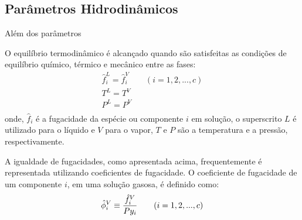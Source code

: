 \begin{enumerate}
\subsection{Parâmetros Hidrodinâmicos}
\label{sec:parametroshidrodinamicos}

Além dos parâmetros 

O equilíbrio termodinâmico é alcançado quando são satisfeitas as condições de equilíbrio químico, térmico e
mecânico entre as fases:
\begin{equation}
\begin{array}{c}
\hat{f}^L_i = \hat{f}^V_i \qquad (i = 1,2,...,c) \\
T^L = T^V \\
P^L = P^V \\
\end{array}
\end{equation}
onde, $\hat{f}_i$ é a fugacidade da espécie ou componente $i$ em solução, o superscrito
$L$ é utilizado para o líquido e $V$ para o vapor, $T$ e $P$ são a temperatura
e a pressão, respectivamente.


A igualdade de fugacidades, como apresentada acima, frequentemente é
representada utilizando coeficientes de fugacidade.
O coeficiente de fugacidade de um componente $i$, em uma solução gasosa, é
definido como:
\begin{equation}
\hat{\phi}^V_i \equiv \dfrac{\hat{f}^V_i}{Py_i} \qquad (i = 1,2,...,c) \\
\label{eq:phidefinition}
\end{equation}



\end{enumerate}
